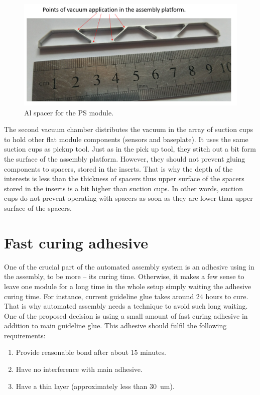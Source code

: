 \begin{figure}[ht]\centering
\includegraphics[width=0.7\linewidth]{Data/Module_assembly/Al_spacer.png}
\caption{Al spacer for the PS module.}
\label{fig:al_spacer}
\end{figure}

The second vacuum chamber distributes the vacuum in the array of suction cups to hold other flat module components (sensors and baseplate). It uses the same suction cups as pickup tool. Just as in the pick up tool, they stitch out a bit form the surface of the assembly platform. However, they should not prevent gluing components to spacers, stored in the inserts. That is why the depth of the interests is less than the thickness of spacers thus upper surface of the spacers stored in the inserts is a bit higher than suction cups. In other words, suction cups do not prevent operating with spacers as soon as they are lower than upper surface of the spacers.

\section{Fast curing adhesive}

One of the crucial part of the automated assembly system is an adhesive using in the assembly, to be more  -- its curing time. Otherwise, it makes a few sense to leave one module for a long time in the whole setup simply waiting the adhesive curing time. For instance, current guideline glue takes around 24 hours to cure. That is why automated assembly needs a technique to avoid such long waiting. One of the proposed decision is using a small amount of fast curing adhesive in addition to main guideline glue. This adhesive should fulfil the following requirements:

\begin{enumerate}
\setlength\itemsep{-0.5em}
\item Provide reasonable bond after about 15 minutes.
\item Have no interference with main adhesive.
\item Have a thin layer (approximately less than 30~um).
\end{enumerate}


